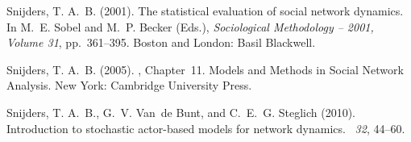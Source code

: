 \documentclass[final]{statsoc}
\begin{document}
\begin{thebibliography}{}
\vspace{-0.6\baselineskip}
Snijders, T. A.~B. (2001).
\newblock The statistical evaluation of social network dynamics.
\newblock In M.~E. Sobel and M.~P. Becker (Eds.), {\em Sociological Methodology
  -- 2001, Volume 31}, pp.\  361--395. Boston and London: Basil Blackwell.

\vspace{-0.6\baselineskip}
Snijders, T. A.~B. (2005).
, Chapter~11.
\newblock Models and Methods in Social Network Analysis. New York: Cambridge
  University Press.

\vspace{-0.6\baselineskip}
Snijders, T. A.~B., G.~V. Van~de Bunt, and C.~E.~G. Steglich (2010).
\newblock Introduction to stochastic actor-based models for network dynamics.
~{\em 32}, 44--60.

\end{thebibliography}
\end{document}
